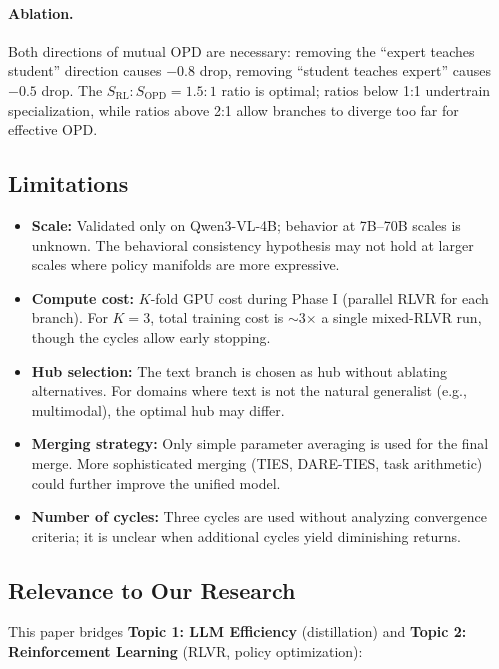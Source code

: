 \documentclass[11pt]{article}
\begin{document}
\paragraph{Ablation.}
Both directions of mutual OPD are necessary: removing the ``expert teaches student'' direction causes $-0.8$ drop, removing ``student teaches expert'' causes $-0.5$ drop. The $S_{\mathrm{RL}} : S_{\mathrm{OPD}} = 1.5 : 1$ ratio is optimal; ratios below 1:1 undertrain specialization, while ratios above 2:1 allow branches to diverge too far for effective OPD.

\subsection{Limitations}

\begin{itemize}
    \item \textbf{Scale:} Validated only on Qwen3-VL-4B; behavior at 7B--70B scales is unknown. The behavioral consistency hypothesis may not hold at larger scales where policy manifolds are more expressive.
    \item \textbf{Compute cost:} $K$-fold GPU cost during Phase I (parallel RLVR for each branch). For $K = 3$, total training cost is $\sim$3$\times$ a single mixed-RLVR run, though the cycles allow early stopping.
    \item \textbf{Hub selection:} The text branch is chosen as hub without ablating alternatives. For domains where text is not the natural generalist (e.g., multimodal), the optimal hub may differ.
    \item \textbf{Merging strategy:} Only simple parameter averaging is used for the final merge. More sophisticated merging (TIES, DARE-TIES, task arithmetic) could further improve the unified model.
    \item \textbf{Number of cycles:} Three cycles are used without analyzing convergence criteria; it is unclear when additional cycles yield diminishing returns.
\end{itemize}

\subsection{Relevance to Our Research}

This paper bridges \textbf{Topic 1: LLM Efficiency} (distillation) and \textbf{Topic 2: Reinforcement Learning} (RLVR, policy optimization):
\end{document}
